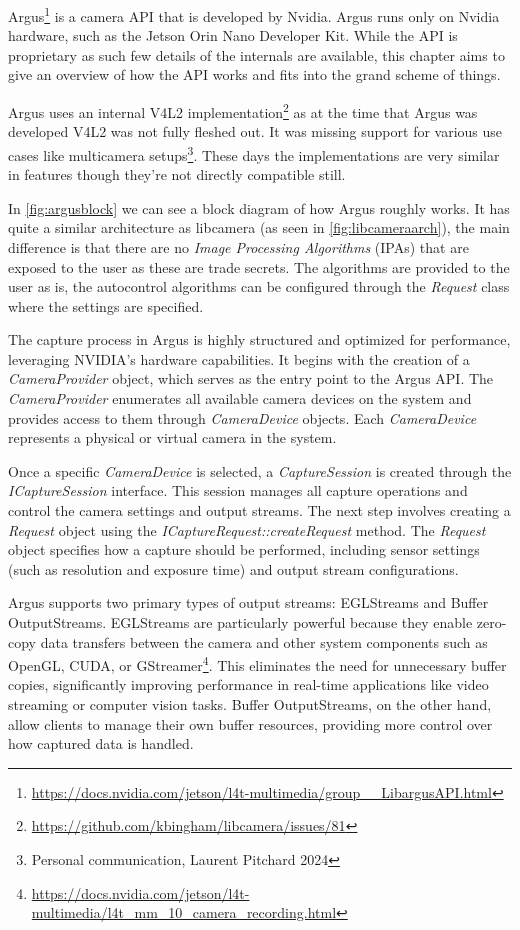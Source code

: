 Argus\footnote{\url{https://docs.nvidia.com/jetson/l4t-multimedia/group\_\_LibargusAPI.html}}
is a camera API that is developed by Nvidia. Argus runs only on Nvidia
hardware, such as the Jetson Orin Nano Developer Kit. While the API is
proprietary as such few details of the internals are available, this chapter
aims to give an overview of how the API works and fits into the grand scheme of
things.

Argus uses an internal V4L2 implementation\footnote{\url{https://github.com/kbingham/libcamera/issues/81}}
as at the time that Argus was developed V4L2 was not fully fleshed out. It was
missing support for various use cases like multicamera setups\footnote{Personal communication, Laurent Pitchard 2024}.
These days the implementations are very similar in features though they're not
directly compatible still.

In \cref{fig:argusblock} we can see a block diagram of how Argus roughly works.
It has quite a similar architecture as libcamera (as seen in
\cref{fig:libcameraarch}), the main difference is that there are no \textit{Image Processing Algorithms} (IPAs) that
are exposed to the user as these are trade secrets. The algorithms are provided
to the user as is, the autocontrol algorithms can be configured through the
\textit{Request} class where the settings are specified.


The capture process in Argus is highly structured and optimized for
performance, leveraging NVIDIA’s hardware capabilities. It begins with the
creation of a \textit{CameraProvider} object, which serves as the entry point
to the Argus API. The \textit{CameraProvider} enumerates all available camera
devices on the system and provides access to them through
\textit{CameraDevice} objects. Each \textit{CameraDevice} represents a
physical or virtual camera in the system.

Once a specific \textit{CameraDevice} is selected, a \textit{CaptureSession} is
created through the \textit{ICaptureSession} interface. This session manages
all capture operations and control the camera settings and output streams. The
next step involves creating a \textit{Request} object using the
\textit{ICaptureRequest::createRequest} method. The \textit{Request} object
specifies how a capture should be performed, including sensor settings (such as
resolution and exposure time) and output stream configurations.

Argus supports two primary types of output streams: EGLStreams and Buffer
OutputStreams. EGLStreams are particularly powerful because they enable
zero-copy data transfers between the camera and other system components such as
OpenGL, CUDA, or GStreamer\footnote{\url{https://docs.nvidia.com/jetson/l4t-multimedia/l4t\_mm\_10\_camera\_recording.html}}.
This eliminates the need for unnecessary buffer copies, significantly improving
performance in real-time applications like video streaming or computer vision
tasks. Buffer OutputStreams, on the other hand, allow clients to manage their
own buffer resources, providing more control over how captured data is handled.

